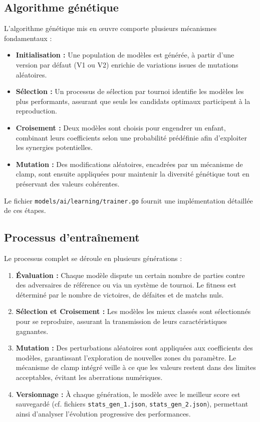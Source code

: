 \documentclass[a4paper,12pt]{article}
\begin{document}
\subsection{Algorithme génétique}
L'algorithme génétique mis en œuvre comporte plusieurs mécanismes fondamentaux :
\begin{itemize}
    \item \textbf{Initialisation :} Une population de modèles est générée, à partir d'une version par défaut (V1 ou V2) enrichie de variations issues de mutations aléatoires.
    \item \textbf{Sélection :} Un processus de sélection par tournoi identifie les modèles les plus performants, assurant que seuls les candidats optimaux participent à la reproduction.
    \item \textbf{Croisement :} Deux modèles sont choisis pour engendrer un enfant, combinant leurs coefficients selon une probabilité prédéfinie afin d'exploiter les synergies potentielles.
    \item \textbf{Mutation :} Des modifications aléatoires, encadrées par un mécanisme de clamp, sont ensuite appliquées pour maintenir la diversité génétique tout en préservant des valeurs cohérentes.
\end{itemize}
Le fichier \texttt{models/ai/learning/trainer.go} fournit une implémentation détaillée de ces étapes.

\subsection{Processus d'entraînement}
Le processus complet se déroule en plusieurs générations :
\begin{enumerate}
    \item \textbf{Évaluation :} Chaque modèle dispute un certain nombre de parties contre des adversaires de référence ou via un système de tournoi. Le fitness est déterminé par le nombre de victoires, de défaites et de matchs nuls.
    \item \textbf{Sélection et Croisement :} Les modèles les mieux classés sont sélectionnés pour se reproduire, assurant la transmission de leurs caractéristiques gagnantes.
    \item \textbf{Mutation :} Des perturbations aléatoires sont appliquées aux coefficients des modèles, garantissant l'exploration de nouvelles zones du paramètre. Le mécanisme de clamp intégré veille à ce que les valeurs restent dans des limites acceptables, évitant les aberrations numériques.
    \item \textbf{Versionnage :} À chaque génération, le modèle avec le meilleur score est sauvegardé (cf. fichiers \texttt{stats\_gen\_1.json}, \texttt{stats\_gen\_2.json}), permettant ainsi d’analyser l’évolution progressive des performances.
\end{enumerate}
\end{document}
